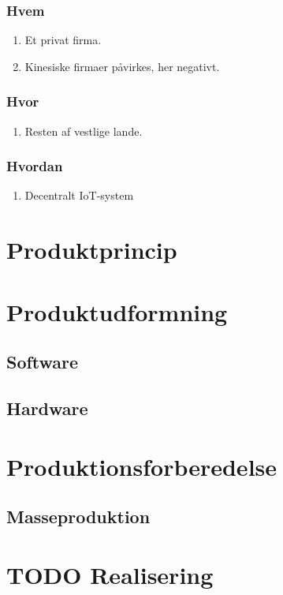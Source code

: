 \documentclass[11pt]{article}
\begin{document}
\subsubsection{Hvem}
\label{sec:orgdc878a7}
\begin{enumerate}
\item Et privat firma.
\item Kinesiske firmaer påvirkes, her negativt.
\end{enumerate}
\subsubsection{Hvor}
\label{sec:orgfd954fc}
\begin{enumerate}
\item Resten af vestlige lande.
\end{enumerate}
\subsubsection{Hvordan}
\label{sec:orgb429efe}
\begin{enumerate}
\item Decentralt IoT-system
\end{enumerate}
\section{Produktprincip}
\label{sec:orgfbbd55a}
\section{Produktudformning}
\label{sec:org9684031}
\subsection{Software}
\label{sec:org7b64fe2}
\subsection{Hardware}
\label{sec:orgec3b2d2}
\section{Produktionsforberedelse}
\label{sec:org3d99a52}
\subsection{Masseproduktion}
\label{sec:orgc5964ea}
\section{{\bfseries\sffamily TODO} Realisering}
\label{sec:org7d42a1d}
\end{document}
